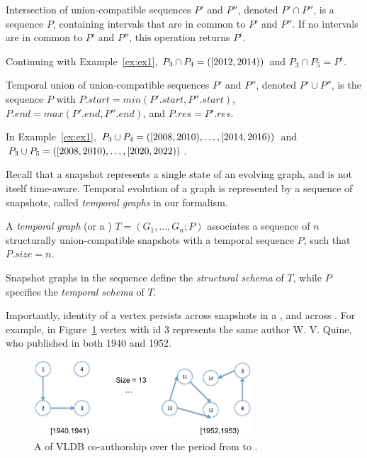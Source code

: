 \begin{definition} 
Intersection of union-compatible sequences $P'$ and $P''$, denoted $P'
\cap P''$, is a sequence $P$, containing intervals that are in common
to $P'$ and $P''$.  If no intervals are in common to $P'$ and $P''$,
this operation returns $P^{\epsilon}$.
\label{def:tseqand}
\end{definition}

Continuing with Example~\ref{ex:ex1}, $P_3 \cap P_4 =
([2012,2014))$ and $P_3 \cap P_5 = P^{\epsilon}$.

\begin{definition} 
Temporal union of union-compatible sequences $P'$ and $P''$, denoted
$P' \cup P''$, is the sequence $P$ with $P.start = min(P'.start,
P''.start)$, $P.end = max(P'.end, P''.end)$, and $P.res = P'.res$.
\label{def:tseqor}
\end{definition}

In Example~\ref{ex:ex1}, $P_3 \cup P_4 =
([2008,2010),\ldots,[2014,2016))$ and $P_3
    \cup P_5 = ([2008,2010), \ldots,
      [2020,2022))$.

Recall that a snapshot represents a single state of an evolving graph,
and is not itself time-aware.  Temporal evolution of a graph is
represented by a sequence of snapshots, called {\em temporal graphs}
in our formalism.

\begin{definition} [TGraph]
A {\em temporal graph} (or a {\em \tg}) $T = (G_1, \ldots, G_n; P)$
  associates a sequence of $n$ structurally union-compatible snapshots
  with a temporal sequence $P$, such that $P.size = n$.
\label{def:tgraph} 
\end{definition}

Snapshot graphs in the sequence define the {\em structural schema} of
$T$, while $P$ specifies the {\em temporal schema} of $T$.

Importantly, identity of a vertex persists across snapshots in a \tg,
and across \tgs.  For example, in Figure~\ref{fig:tgraph} vertex with
id 3 represents the same author W. V. Quine, who published in both
1940 and 1952.

\begin{figure}
\includegraphics[width=3.2in]{figs/temporalgraph.pdf}
\caption{A \tg of VLDB co-authorship over the period from  to .}
\label{fig:tgraph}
\end{figure}

